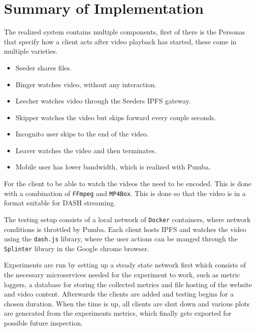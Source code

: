 \section{Summary of Implementation}
The realized system contains multiple components, first of there is the Personas that specify how a client acts after video playback has started, these come in multiple varieties.
\begin{itemize}
    \item Seeder shares files.
    \item Binger watches video, without any interaction.
    \item Leecher watches video through the Seeders \ac{IPFS} gateway.
    \item Skipper watches the video but skips forward every couple seconds.
    \item Incognito user skips to the end of the video.
    \item Leaver watches the video and then terminates.
    \item Mobile user has lower bandwidth, which is realized with Pumba.
\end{itemize}

For the client to be able to watch the videos the need to be encoded. This is done with a combination of \texttt{FFmpeg} and \texttt{MP4Box}. This is done so that the video is in a format suitable for \ac{DASH} streaming.

The testing setup consists of a local network of \texttt{Docker} containers, where network conditions is throttled by Pumba. Each client hosts \ac{IPFS} and watches the video using the \texttt{dash.js} library, where the user actions can be manged through the \texttt{Splinter} library in the Google chrome browser.

Experiments are run by setting up a steady state network first which consists of the necessary microservices needed for the experiment to work, such as metric loggers, a database for storing the collected metrics and file hosting of the website and video content. Afterwards the clients are added and testing begins for a chosen duration. When the time is up, all clients are shut down and various plots are generated from the experiments metrics, which finally gets exported for possible future inspection.
